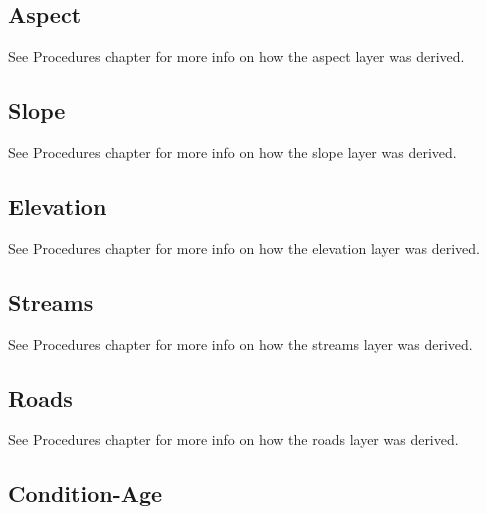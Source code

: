 \subsection{Aspect}
See Procedures chapter for more info on how the aspect layer was derived.

\subsection{Slope}
See Procedures chapter for more info on how the slope layer was derived.

\subsection{Elevation}
See Procedures chapter for more info on how the elevation layer was derived.

\subsection{Streams}
See Procedures chapter for more info on how the streams layer was derived.

\subsection{Roads}
See Procedures chapter for more info on how the roads layer was derived.

\subsection{Condition-Age} 

